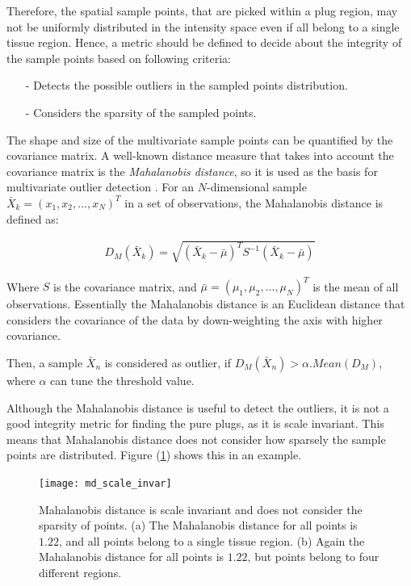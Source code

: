 Therefore, the spatial sample points, that are picked within a plug region, may not be uniformly distributed in the intensity space even if all belong to a single tissue region.
Hence, a metric should be defined to decide about the integrity of the sample points based on following criteria:

\begin{itemize}
    \item[-] Detects the possible outliers in the sampled points distribution.
    \item[-] Considers the sparsity of the sampled points. 
\end{itemize}

The shape and size of the multivariate sample points can be quantified by the covariance matrix. A well-known distance measure that takes into account the covariance matrix is the \textit{Mahalanobis distance}, so it is used as the basis for multivariate outlier detection \cite{filzmoser2004}. 
For an $N$-dimensional sample $\bar{X}_k = (x_1, x_2, ..., x_N)^{T}$ in a set of observations, the Mahalanobis distance is defined as:

\begin{equation}
\begin{gathered}
D_M(\bar{X}_k)=\sqrt{(\bar{X}_k-\bar{\mu})^T S^{-1} (\bar{X}_k-\bar{\mu})}
\end{gathered}
\end{equation}

Where $S$ is the covariance matrix, and $\bar{\mu} = (\mu_1, \mu_2, ..., \mu_N)^{T}$ is the mean of all observations.
Essentially the Mahalanobis distance is an Euclidean distance that considers the covariance of the data by down-weighting the axis with higher covariance.

Then, a sample $\bar{X}_n$ is considered as outlier, if $D_M(\bar{X}_n) > \alpha.Mean(D_M)$, where $\alpha$ can tune the threshold value.

Although the Mahalanobis distance is useful to detect the outliers, it is not a good integrity metric for finding the pure plugs, as it is scale invariant. This means that Mahalanobis distance does not consider how sparsely the sample points are distributed. Figure (\ref{fig:md_scale_invar}) shows this in an example.

\begin{figure}
\centering
\texttt{[image: md\_scale\_invar]}\
\centering
\caption{Mahalanobis distance is scale invariant and does not consider the sparsity of points. (a) The Mahalanobis distance for all points is $1.22$, and all points belong to a single tissue region. (b) Again the Mahalanobis distance for all points is $1.22$, but points belong to four different regions.} 
\label{fig:md_scale_invar}
\end{figure}

